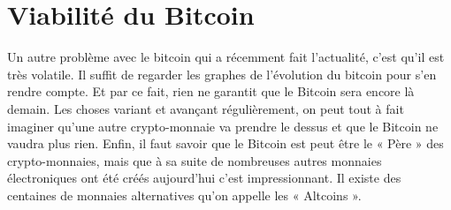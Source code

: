 \documentclass{bredele} %
\begin{document}
    \section*{Viabilité du Bitcoin}
    Un autre problème avec le bitcoin qui a récemment fait l’actualité, c’est qu’il est très volatile. Il suffit de regarder les graphes de l’évolution du bitcoin pour s’en rendre compte. Et par ce fait, rien ne garantit que le Bitcoin sera encore là demain. Les choses variant et avançant régulièrement, on peut tout à fait imaginer qu’une autre crypto-monnaie va prendre le dessus et que le Bitcoin ne vaudra plus rien.
    \newline
    Enfin, il faut savoir que le Bitcoin est peut être le « Père » des crypto-monnaies, mais que à sa suite de nombreuses autres monnaies électroniques ont été créés aujourd’hui c’est impressionnant. Il existe des centaines de monnaies alternatives qu’on appelle les « Altcoins ».
\end{document}
